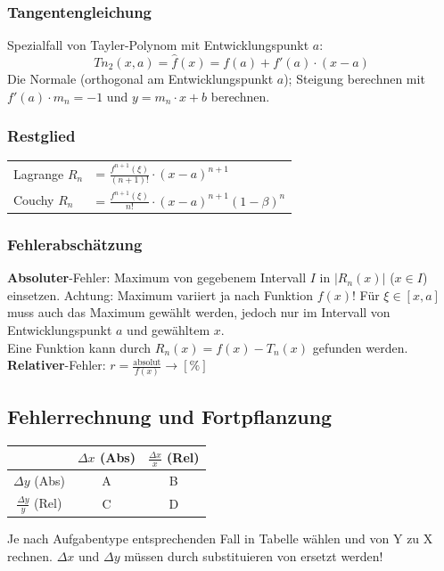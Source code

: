 \subsubsection{Tangentengleichung}
Spezialfall von Tayler-Polynom mit Entwicklungspunkt $a$:
\[Tn_2(x, a) = \hat{f}(x) = f(a) + f'(a)\cdot(x - a)\]
Die Normale (orthogonal am Entwicklungspunkt $a$); Steigung berechnen mit $f'(a) \cdot m_n = -1$ und $y = m_n \cdot x + b$ berechnen.

\subsubsection{Restglied}
\begin{tabular}{ll}
	Lagrange $R_n$ &= $\frac{f^{n + 1}(\xi)}{(n + 1)!} \cdot (x - a)^{n+1}$\\
	Couchy $R_n$ &= $\frac{f^{n + 1}(\xi)}{n!} \cdot (x - a)^{n+1} (1 - \beta)^n$
\end{tabular}


\subsubsection{Fehlerabschätzung}
\textbf{Absoluter}-Fehler: Maximum von gegebenem Intervall $I$ in $\left|R_n(x)\right|$ ($x \in I$) einsetzen. Achtung: Maximum variiert ja nach Funktion $f(x)$! Für $\xi \in [x, a]$ muss auch das Maximum gewählt werden, jedoch nur im Intervall von Entwicklungspunkt $a$ und gewähltem $x$.\\

\noindent Eine Funktion kann durch $R_n(x) = f(x) - T_n(x)$ gefunden werden.\\

\noindent\textbf{Relativer}-Fehler: $r = \frac{\text{absolut}}{f(x)} \rightarrow [\%]$

\subsection{Fehlerrechnung und Fortpflanzung}
\begin{center}
	\begin{tabular}{c|c|c|}
		\diagbox{Y}{X} & $\Delta x$ (Abs) & $\frac{\Delta x}{x}$ (Rel) \\
		\midrule
		$\Delta y$ (Abs) & A & B \\
		\midrule
		$\frac{\Delta y}{y}$ (Rel) & C & D
	\end{tabular}
\end{center}

\noindent Je nach Aufgabentype entsprechenden Fall in Tabelle wählen und von Y zu X rechnen. $\Delta x$ und $\Delta y$ müssen durch substituieren von  ersetzt werden!

